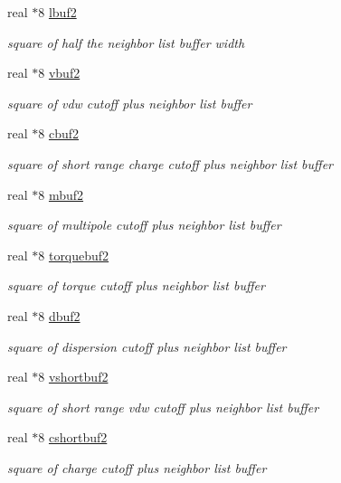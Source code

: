 \begin{DoxyCompactItemize}
real $\ast$8 \hyperlink{classneigh_aee6d4c42a6432bbfb95bd9eae5c696a7}{lbuf2}
\begin{DoxyCompactList}\small\item\em square of half the neighbor list buffer width \end{DoxyCompactList}\item 
real $\ast$8 \hyperlink{classneigh_af1b5dc4cada84bd65f6b215bcbf8a344}{vbuf2}
\begin{DoxyCompactList}\small\item\em square of vdw cutoff plus neighbor list buffer \end{DoxyCompactList}\item 
real $\ast$8 \hyperlink{classneigh_a510e225bf421ef9c1de15bece3739532}{cbuf2}
\begin{DoxyCompactList}\small\item\em square of short range charge cutoff plus neighbor list buffer \end{DoxyCompactList}\item 
real $\ast$8 \hyperlink{classneigh_ad76c9a558fd93db7cba1761d4580c929}{mbuf2}
\begin{DoxyCompactList}\small\item\em square of multipole cutoff plus neighbor list buffer \end{DoxyCompactList}\item 
real $\ast$8 \hyperlink{classneigh_a6054edfe32412b415a10516845d2403e}{torquebuf2}
\begin{DoxyCompactList}\small\item\em square of torque cutoff plus neighbor list buffer \end{DoxyCompactList}\item 
real $\ast$8 \hyperlink{classneigh_a55976e0ec479b7cb47341b0b382018ba}{dbuf2}
\begin{DoxyCompactList}\small\item\em square of dispersion cutoff plus neighbor list buffer \end{DoxyCompactList}\item 
real $\ast$8 \hyperlink{classneigh_a2f24e9959d5d21f7677ab4f702359f4e}{vshortbuf2}
\begin{DoxyCompactList}\small\item\em square of short range vdw cutoff plus neighbor list buffer \end{DoxyCompactList}\item 
real $\ast$8 \hyperlink{classneigh_a8b4d64898ca057d264af5504faf124c7}{cshortbuf2}
\begin{DoxyCompactList}\small\item\em square of charge cutoff plus neighbor list buffer \end{DoxyCompactList}\item 

\end{DoxyCompactItemize}

